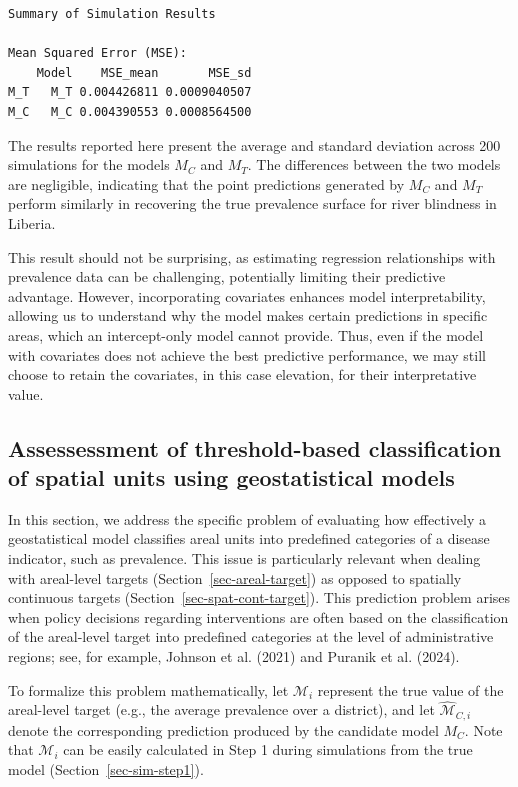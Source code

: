\documentclass[
  letterpaper,
]{krantz}
\begin{document}
\begin{verbatim}
Summary of Simulation Results

Mean Squared Error (MSE):
    Model    MSE_mean       MSE_sd
M_T   M_T 0.004426811 0.0009040507
M_C   M_C 0.004390553 0.0008564500
\end{verbatim}

The results reported here present the average and standard deviation
across 200 simulations for the models \(M_C\) and \(M_T\). The
differences between the two models are negligible, indicating that the
point predictions generated by \(M_C\) and \(M_T\) perform similarly in
recovering the true prevalence surface for river blindness in Liberia.

This result should not be surprising, as estimating regression
relationships with prevalence data can be challenging, potentially
limiting their predictive advantage. However, incorporating covariates
enhances model interpretability, allowing us to understand why the model
makes certain predictions in specific areas, which an intercept-only
model cannot provide. Thus, even if the model with covariates does not
achieve the best predictive performance, we may still choose to retain
the covariates, in this case elevation, for their interpretative value.

\subsection{Assessessment of threshold-based classification of spatial
units using geostatistical models}\label{sec-sim-assessment}

In this section, we address the specific problem of evaluating how
effectively a geostatistical model classifies areal units into
predefined categories of a disease indicator, such as prevalence. This
issue is particularly relevant when dealing with areal-level targets
(Section~\ref{sec-areal-target}) as opposed to spatially continuous
targets (Section~\ref{sec-spat-cont-target}). This prediction problem
arises when policy decisions regarding interventions are often based on
the classification of the areal-level target into predefined categories
at the level of administrative regions; see, for example, Johnson et al.
(2021) and Puranik et al. (2024).

To formalize this problem mathematically, let \(\mathcal{M}_i\)
represent the true value of the areal-level target (e.g., the average
prevalence over a district), and let \(\hat{\mathcal{M}}_{C,i}\) denote
the corresponding prediction produced by the candidate model \(M_C\).
Note that \(\mathcal{M}_i\) can be easily calculated in Step 1 during
simulations from the true model (Section~\ref{sec-sim-step1}).
\end{document}
